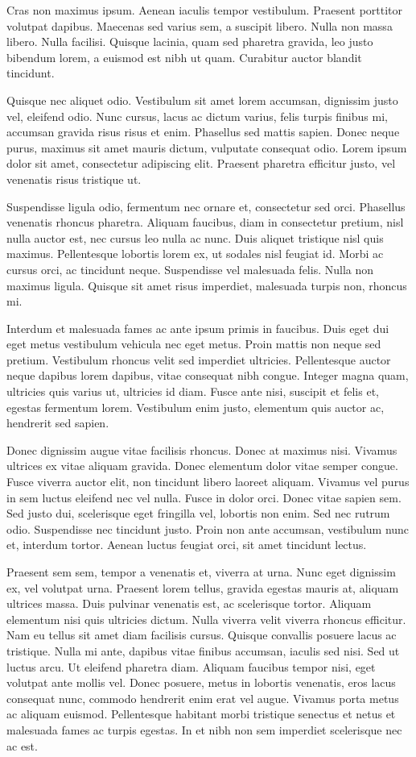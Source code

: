 Cras non maximus ipsum. Aenean iaculis tempor vestibulum. Praesent porttitor volutpat dapibus. Maecenas sed varius sem, a suscipit libero. Nulla non massa libero. Nulla facilisi. Quisque lacinia, quam sed pharetra gravida, leo justo bibendum lorem, a euismod est nibh ut quam. Curabitur auctor blandit tincidunt.

Quisque nec aliquet odio. Vestibulum sit amet lorem accumsan, dignissim justo vel, eleifend odio. Nunc cursus, lacus ac dictum varius, felis turpis finibus mi, accumsan gravida risus risus et enim. Phasellus sed mattis sapien. Donec neque purus, maximus sit amet mauris dictum, vulputate consequat odio. Lorem ipsum dolor sit amet, consectetur adipiscing elit. Praesent pharetra efficitur justo, vel venenatis risus tristique ut.

Suspendisse ligula odio, fermentum nec ornare et, consectetur sed orci. Phasellus venenatis rhoncus pharetra. Aliquam faucibus, diam in consectetur pretium, nisl nulla auctor est, nec cursus leo nulla ac nunc. Duis aliquet tristique nisl quis maximus. Pellentesque lobortis lorem ex, ut sodales nisl feugiat id. Morbi ac cursus orci, ac tincidunt neque. Suspendisse vel malesuada felis. Nulla non maximus ligula. Quisque sit amet risus imperdiet, malesuada turpis non, rhoncus mi.

Interdum et malesuada fames ac ante ipsum primis in faucibus. Duis eget dui eget metus vestibulum vehicula nec eget metus. Proin mattis non neque sed pretium. Vestibulum rhoncus velit sed imperdiet ultricies. Pellentesque auctor neque dapibus lorem dapibus, vitae consequat nibh congue. Integer magna quam, ultricies quis varius ut, ultricies id diam. Fusce ante nisi, suscipit et felis et, egestas fermentum lorem. Vestibulum enim justo, elementum quis auctor ac, hendrerit sed sapien.

Donec dignissim augue vitae facilisis rhoncus. Donec at maximus nisi. Vivamus ultrices ex vitae aliquam gravida. Donec elementum dolor vitae semper congue. Fusce viverra auctor elit, non tincidunt libero laoreet aliquam. Vivamus vel purus in sem luctus eleifend nec vel nulla. Fusce in dolor orci. Donec vitae sapien sem. Sed justo dui, scelerisque eget fringilla vel, lobortis non enim. Sed nec rutrum odio. Suspendisse nec tincidunt justo. Proin non ante accumsan, vestibulum nunc et, interdum tortor. Aenean luctus feugiat orci, sit amet tincidunt lectus.

Praesent sem sem, tempor a venenatis et, viverra at urna. Nunc eget dignissim ex, vel volutpat urna. Praesent lorem tellus, gravida egestas mauris at, aliquam ultrices massa. Duis pulvinar venenatis est, ac scelerisque tortor. Aliquam elementum nisi quis ultricies dictum. Nulla viverra velit viverra rhoncus efficitur. Nam eu tellus sit amet diam facilisis cursus. Quisque convallis posuere lacus ac tristique. Nulla mi ante, dapibus vitae finibus accumsan, iaculis sed nisi. Sed ut luctus arcu. Ut eleifend pharetra diam. Aliquam faucibus tempor nisi, eget volutpat ante mollis vel. Donec posuere, metus in lobortis venenatis, eros lacus consequat nunc, commodo hendrerit enim erat vel augue. Vivamus porta metus ac aliquam euismod. Pellentesque habitant morbi tristique senectus et netus et malesuada fames ac turpis egestas. In et nibh non sem imperdiet scelerisque nec ac est.